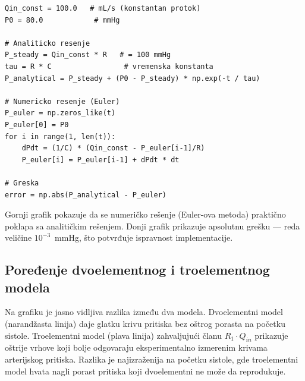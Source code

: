 \documentclass[12pt,a4paper]{article}
\begin{document}
\begin{lstlisting}[caption={Validacija: poređenje numeričkog i analitičkog rešenja}]
Qin_const = 100.0   # mL/s (konstantan protok)
P0 = 80.0            # mmHg

# Analiticko resenje
P_steady = Qin_const * R   # = 100 mmHg
tau = R * C                 # vremenska konstanta
P_analytical = P_steady + (P0 - P_steady) * np.exp(-t / tau)

# Numericko resenje (Euler)
P_euler = np.zeros_like(t)
P_euler[0] = P0
for i in range(1, len(t)):
    dPdt = (1/C) * (Qin_const - P_euler[i-1]/R)
    P_euler[i] = P_euler[i-1] + dPdt * dt

# Greska
error = np.abs(P_analytical - P_euler)
\end{lstlisting}


Gornji grafik pokazuje da se numeričko rešenje (Euler-ova metoda) praktično poklapa sa analitičkim rešenjem. Donji grafik prikazuje apsolutnu grešku --- reda veličine $10^{-3}$~mmHg, što potvrđuje ispravnost implementacije.


\subsection{Poređenje dvoelementnog i troelementnog modela}


Na grafiku je jasno vidljiva razlika između dva modela. Dvoelementni model (narandžasta linija) daje glatku krivu pritiska bez oštrog porasta na početku sistole. Troelementni model (plava linija) zahvaljujući članu $R_1 \cdot Q_{in}$ prikazuje oštrije vrhove koji bolje odgovaraju eksperimentalno izmerenim krivama arterijskog pritiska. Razlika je najizraženija na početku sistole, gde troelementni model hvata nagli porast pritiska koji dvoelementni ne može da reprodukuje.
\end{document}
